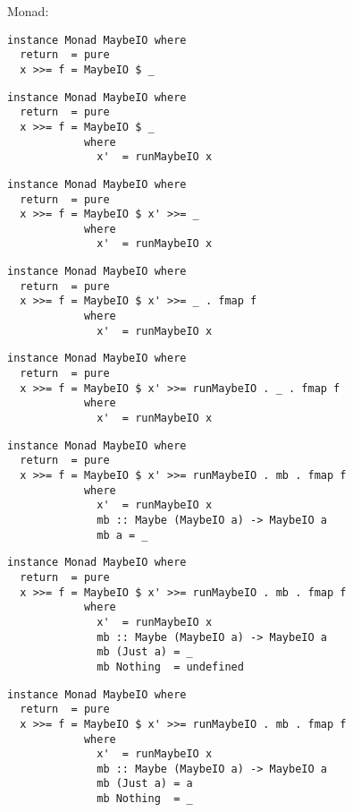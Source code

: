 \documentclass{beamer}
\begin{document}
\begin{frame}[fragile]
Monad:
\begin{overprint}
\begin{verbatim}
instance Monad MaybeIO where
  return  = pure
  x >>= f = MaybeIO $ _
\end{verbatim}
\begin{verbatim}
instance Monad MaybeIO where
  return  = pure
  x >>= f = MaybeIO $ _
            where
              x'  = runMaybeIO x
\end{verbatim}
\begin{verbatim}
instance Monad MaybeIO where
  return  = pure
  x >>= f = MaybeIO $ x' >>= _
            where
              x'  = runMaybeIO x
\end{verbatim}
\begin{verbatim}
instance Monad MaybeIO where
  return  = pure
  x >>= f = MaybeIO $ x' >>= _ . fmap f
            where
              x'  = runMaybeIO x
\end{verbatim}
\begin{verbatim}
instance Monad MaybeIO where
  return  = pure
  x >>= f = MaybeIO $ x' >>= runMaybeIO . _ . fmap f
            where
              x'  = runMaybeIO x
\end{verbatim}
\begin{verbatim}
instance Monad MaybeIO where
  return  = pure
  x >>= f = MaybeIO $ x' >>= runMaybeIO . mb . fmap f
            where
              x'  = runMaybeIO x
              mb :: Maybe (MaybeIO a) -> MaybeIO a
              mb a = _
\end{verbatim}
\begin{verbatim}
instance Monad MaybeIO where
  return  = pure
  x >>= f = MaybeIO $ x' >>= runMaybeIO . mb . fmap f
            where
              x'  = runMaybeIO x
              mb :: Maybe (MaybeIO a) -> MaybeIO a
              mb (Just a) = _
              mb Nothing  = undefined
\end{verbatim}
\begin{verbatim}
instance Monad MaybeIO where
  return  = pure
  x >>= f = MaybeIO $ x' >>= runMaybeIO . mb . fmap f
            where
              x'  = runMaybeIO x
              mb :: Maybe (MaybeIO a) -> MaybeIO a
              mb (Just a) = a
              mb Nothing  = _
\end{verbatim}
\begin{verbatim}

\end{verbatim}
\end{overprint}
\end{frame}
\end{document}
